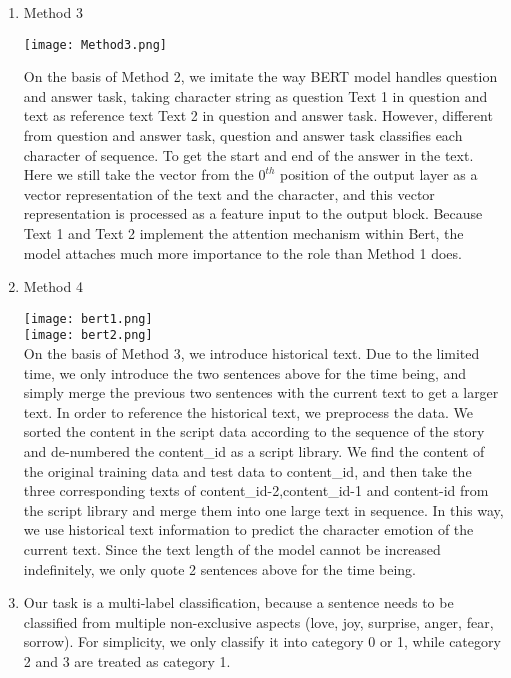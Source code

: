 \documentclass[12pt,twocolumn,letterpaper]{article}
\begin{document}
\begin{enumerate}
\item Method 3

\texttt{[image: Method3.png]}

 On the basis of Method 2, we imitate the way BERT model handles question and answer task, taking character string as question Text 1 in question and text as reference text Text 2 in question and answer task. However, different from question and answer task, question and answer task classifies each character of sequence. To get the start and end of the answer in the text. Here we still take the vector from the $0^{th}$ position of the output layer as a vector representation of the text and the character, and this vector representation is processed as a feature input to the output block. Because Text 1 and Text 2 implement the attention mechanism within Bert, the model attaches much more importance to the role than Method 1 does.  

\item Method 4

\texttt{[image: bert1.png]}\\

\texttt{[image: bert2.png]}\\

On the basis of Method 3, we introduce historical text. Due to the limited time, we only introduce the two sentences above for the time being, and simply merge the previous two sentences with the current text to get a larger text. In order to reference the historical text, we preprocess the data. We sorted the content in the script data according to the sequence of the story and de-numbered the content\_id as a script library. We find the content of the original training data and test data to content\_id, and then take the three corresponding texts of content\_id-2,content\_id-1 and content-id from the script library and merge them into one large text in sequence. 
In this way, we use historical text information to predict the character emotion of the current text. Since the text length of the model cannot be increased indefinitely, we only quote 2 sentences above for the time being. 


\item Our task is a multi-label classification, because a sentence needs to be classified from multiple non-exclusive aspects (love, joy, surprise, anger, fear, sorrow). For simplicity, we only classify it into category 0 or 1, while category 2 and 3 are treated as category 1.  


\end{enumerate}
\end{document}
